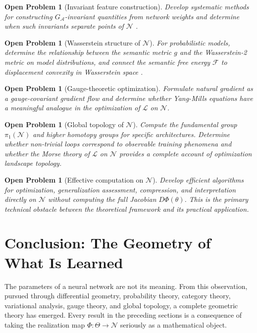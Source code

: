 \documentclass[twocolumn,10pt]{article}
\theoremstyle{thmstyle}
\theoremstyle{defstyle}
\newtheorem{openp}[theorem]{Open Problem}
\begin{document}
\begin{openp}[Invariant feature construction]
Develop systematic methods for constructing $G_\mathcal{A}$-invariant
quantities from network weights and determine when such invariants
separate points of $\mathcal{N}$ \citep{olah2020zoom,elhage2021mathematical}.
\end{openp}

\begin{openp}[Wasserstein structure of $\mathcal{N}$]
For probabilistic models, determine the relationship between the semantic
metric $g$ and the Wasserstein-2 metric on model distributions, and
connect the semantic free energy $\mathcal{F}$ to displacement convexity
in Wasserstein space \citep{villani2009optimal}.
\end{openp}

\begin{openp}[Gauge-theoretic optimization]
Formulate natural gradient as a gauge-covariant gradient flow and
determine whether Yang-Mills equations have a meaningful analogue in the
optimization of $\mathcal{L}$ on $\mathcal{N}$.
\end{openp}

\begin{openp}[Global topology of $\mathcal{N}$]
Compute the fundamental group $\pi_1(\mathcal{N})$ and higher homotopy
groups for specific architectures. Determine whether non-trivial loops
correspond to observable training phenomena and whether the Morse
theory of $\mathcal{L}$ on $\mathcal{N}$ provides a complete account of
optimization landscape topology.
\end{openp}

\begin{openp}[Effective computation on $\mathcal{N}$]
Develop efficient algorithms for optimization, generalization assessment,
compression, and interpretation directly on $\mathcal{N}$ without
computing the full Jacobian $D\Phi(\theta)$. This is the primary
technical obstacle between the theoretical framework and its practical
application.
\end{openp}

\section{Conclusion: The Geometry of What Is Learned}
\label{sec:conclusion}

The parameters of a neural network are not its meaning. From this
observation, pursued through differential geometry, probability theory,
category theory, variational analysis, gauge theory, and global
topology, a complete geometric theory has emerged. Every result in the
preceding sections is a consequence of taking the realization map
$\Phi : \Theta \to \mathcal{N}$ seriously as a mathematical object.
\end{document}

